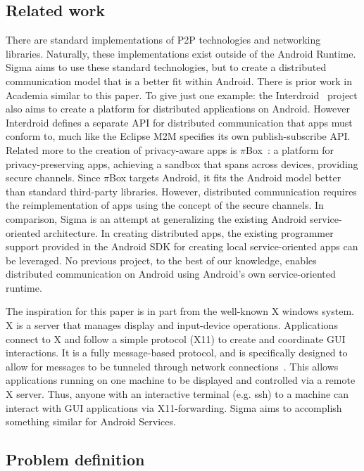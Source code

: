 \documentclass[prodmode]{acmlarge}
\begin{document}
\subsection{Related work}
There are standard implementations of P2P technologies and networking libraries. Naturally, these implementations exist outside of the Android Runtime. Sigma aims to use these standard technologies, but to create a distributed communication model that is a better fit within Android. There is prior work in Academia similar to this paper. To give just one example: the Interdroid~\cite{Interdroid,PalmerThesis} project also aims to create a platform for distributed applications on Android. However Interdroid defines a separate API for distributed communication that apps must conform to, much like the Eclipse M2M specifies its own publish-subscribe API. Related more to the creation of privacy-aware apps is $\pi$Box~\cite{piBox}: a platform for privacy-preserving apps, achieving a sandbox that spans across devices, providing secure channels. Since $\pi$Box targets Android, it fits the Android model better than standard third-party libraries. However, distributed communication requires the reimplementation of apps using the concept of the secure channels. In comparison, Sigma is an attempt at generalizing the existing Android service-oriented architecture. In creating distributed apps, the existing programmer support provided in the Android SDK for creating local service-oriented apps can be leveraged. No previous project, to the best of our knowledge, enables distributed communication on Android using Android's own service-oriented runtime.

The inspiration for this paper is in part from the well-known X windows system. X is a server that manages display and input-device operations. Applications connect to X and follow a simple protocol (X11) to create and coordinate GUI interactions. It is a fully message-based protocol, and is specifically designed to allow for messages to be tunneled through network connections~\cite{X11}. This allows applications running on one machine to be displayed and controlled via a remote X server. Thus, anyone with an interactive terminal (e.g. ssh) to a machine can interact with GUI applications via X11-forwarding. Sigma aims to accomplish something similar for Android Services.

\subsection{Problem definition}
\end{document}
